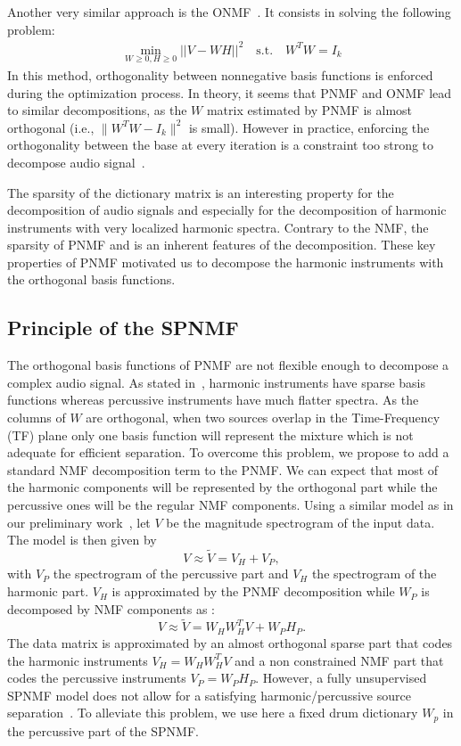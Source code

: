 \documentclass{article}
\begin{document}
Another very similar approach is the ONMF~\cite{choi}. It consists in solving the following problem: 
\begin{align}
\min_{W \geqslant 0, H \geqslant0} ||V - WH||^2 \quad   \text{s.t}.\quad W^{T}W=I_{k} 
\end{align}%
In this method, orthogonality between nonnegative basis functions is enforced during the optimization process. In theory, it seems that PNMF and ONMF lead to similar decompositions, as the $W$ matrix estimated by PNMF is almost orthogonal (i.e., $\|W^{T}W-I_{k}\|^{2}$ is small). However in practice, enforcing the orthogonality between the base at every iteration is a constraint too strong to decompose audio signal~\cite{laroche2015structured}. 

The sparsity of the dictionary matrix is an interesting property for the decomposition of audio signals and especially for the decomposition of harmonic instruments with very localized harmonic spectra. Contrary to the NMF, the sparsity of PNMF and is an inherent features of the decomposition. These key properties of PNMF motivated us to decompose the harmonic instruments with the orthogonal basis functions.


\subsection{Principle of the SPNMF}

The orthogonal basis functions of PNMF are not flexible enough to decompose a complex audio signal. As stated in~\cite{canadas2014percussive}, harmonic instruments have sparse basis functions whereas percussive instruments have much flatter spectra. As the columns of $W$ are orthogonal, when two sources overlap in the Time-Frequency (TF) plane only one basis function will represent the mixture which is not adequate for efficient separation. To overcome this problem, we propose to add a standard NMF decomposition term to the PNMF. We can expect that most of the harmonic components will be represented by the orthogonal part while the percussive ones will be the regular NMF components. Using a similar model as in our preliminary work~\cite{laroche2015structured}, let $V$ be the magnitude spectrogram of the input data. The model is then given by
\begin{equation} \label{Cfunction}
V \approx \tilde{V}= V_H + V_{P},
\end{equation}
with $V_P$ the spectrogram of the percussive part and $V_H$ the spectrogram of the harmonic part. $V_H$ is approximated by the PNMF decomposition while $W_P$ is decomposed by NMF components as :
\begin{equation}
V \approx \tilde{V}= W_{H}W_{H}^{T}V + W_{P} H_{P}.
\end{equation}
The data matrix is approximated by an almost orthogonal sparse part that codes the harmonic instruments $V_H = W_HW_H^T V$ and a non constrained NMF part that codes the percussive instruments $V_P = W_PH_P$. However, a fully unsupervised SPNMF model does not allow for a satisfying harmonic/percussive source separation~\cite{laroche2015structured}. To alleviate this problem, we use here a fixed drum dictionary $W_p$ in the percussive part of the SPNMF.
\end{document}
